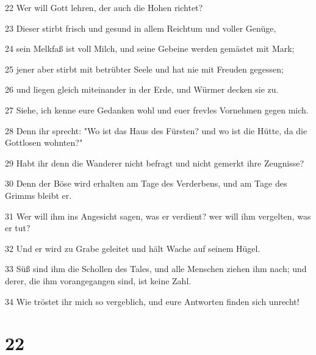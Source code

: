 \par 22 Wer will Gott lehren, der auch die Hohen richtet?
\par 23 Dieser stirbt frisch und gesund in allem Reichtum und voller Genüge,
\par 24 sein Melkfaß ist voll Milch, und seine Gebeine werden gemästet mit Mark;
\par 25 jener aber stirbt mit betrübter Seele und hat nie mit Freuden gegessen;
\par 26 und liegen gleich miteinander in der Erde, und Würmer decken sie zu.
\par 27 Siehe, ich kenne eure Gedanken wohl und euer frevles Vornehmen gegen mich.
\par 28 Denn ihr sprecht: "Wo ist das Haus des Fürsten? und wo ist die Hütte, da die Gottlosen wohnten?"
\par 29 Habt ihr denn die Wanderer nicht befragt und nicht gemerkt ihre Zeugnisse?
\par 30 Denn der Böse wird erhalten am Tage des Verderbens, und am Tage des Grimms bleibt er.
\par 31 Wer will ihm ins Angesicht sagen, was er verdient? wer will ihm vergelten, was er tut?
\par 32 Und er wird zu Grabe geleitet und hält Wache auf seinem Hügel.
\par 33 Süß sind ihm die Schollen des Tales, und alle Menschen ziehen ihm nach; und derer, die ihm vorangegangen sind, ist keine Zahl.
\par 34 Wie tröstet ihr mich so vergeblich, und eure Antworten finden sich unrecht!

\chapter{22}


